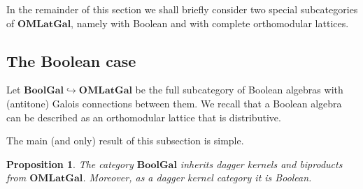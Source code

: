 \documentclass{article}
\newtheorem{proposition}[theorem]{Proposition}
\newcommand{\Cat}[1]{\ensuremath{\mathbf{#1}}}
\begin{document}
In the remainder of this section we shall briefly consider two
special subcategories of \Cat{OMLatGal}, namely with Boolean
and with complete orthomodular lattices.



\subsection{The Boolean case}\label{BooleanSubsec}

Let $\Cat{BoolGal} \hookrightarrow \Cat{OMLatGal}$ be the full
subcategory of Boolean algebras with (antitone) Galois connections
between them. We recall that a Boolean algebra can be described as an
orthomodular lattice that is distributive.

The main (and only) result of this subsection is simple.


\begin{proposition}
\label{BoolGalStructProp}
The category \Cat{BoolGal} inherits dagger kernels and biproducts
from \Cat{OMLatGal}. Moreover, as a dagger kernel category it is
Boolean.
\end{proposition}
\end{document}
